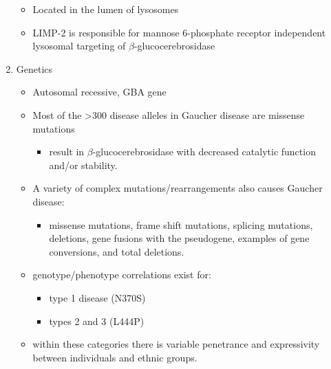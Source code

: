 \documentclass{scrartcl}
\begin{document}
\begin{enumerate}
\begin{itemize}
\item Located in the lumen of lysosomes
\item LIMP-2 is responsible for mannose 6-phosphate receptor independent
lysosomal targeting of \(\beta\)-glucocerebrosidase
\end{itemize}

\item Genetics
\label{sec:org0d76244}
\begin{itemize}
\item Autosomal recessive, GBA gene
\item Most of the >300 disease alleles in Gaucher disease are missense
mutations
\begin{itemize}
\item result in \(\beta\)-glucocerebrosidase with decreased catalytic
function and/or stability.
\end{itemize}
\item A variety of complex mutations/rearrangements also causes Gaucher
disease:
\begin{itemize}
\item missense mutations, frame shift mutations, splicing mutations,
deletions, gene fusions with the pseudogene, examples of gene
conversions, and total deletions.
\end{itemize}
\item genotype/phenotype correlations exist for:
\begin{itemize}
\item type 1 disease (N370S)
\item types 2 and 3 (L444P)
\end{itemize}
\item within these categories there is variable penetrance and
expressivity between individuals and ethnic groups.
\end{itemize}
\end{enumerate}
\end{document}
